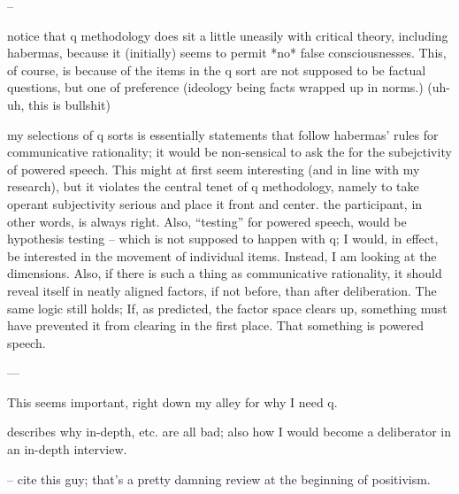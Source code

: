 --

notice that q methodology does sit a little uneasily with critical theory, including habermas, because it (initially) seems to permit *no* false consciousnesses.
This, of course, is because of the items in the q sort are not supposed to be factual questions, but one of preference (ideology being facts wrapped up in norms.) (uh-uh, this is bullshit)

my selections of q sorts is essentially statements that follow habermas' rules for communicative rationality; it would be non-sensical to ask the for the subejctivity of powered speech.
This might at first seem interesting (and in line with my research), but it violates the central tenet of q methodology, namely to take operant subjectivity serious and place it front and center.
the participant, in other words, is always right.
Also, ``testing'' for powered speech, would be hypothesis testing – which is not supposed to happen with q; I would, in effect, be interested in the movement of individual items.
Instead, I am looking at the dimensions.
Also, if there is such a thing as communicative rationality, it should reveal itself in neatly aligned factors, if not before, than after deliberation.
The same logic still holds; If, as predicted, the factor space clears up, something must have prevented it from clearing in the first place. That something is powered speech.

---

\cite{dryzek2005handle} This seems important, right down my alley for why I need q.

describes why in-depth, etc. are all bad; also how I would become a deliberator in an in-depth interview.

--
\cite{Durning1999} cite this guy; that's a pretty damning review at the beginning of positivism.
